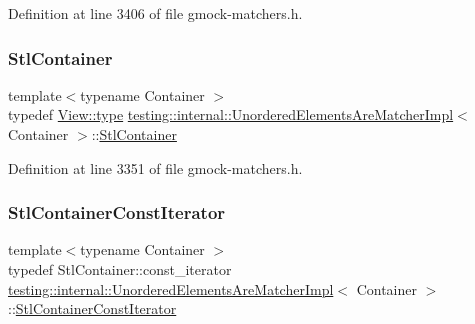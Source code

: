 Definition at line 3406 of file gmock-\/matchers.\+h.

\mbox{\label{classtesting_1_1internal_1_1UnorderedElementsAreMatcherImpl_a6c23354dfe53bb47fa3d38d2869e273c}} 
\subsubsection{\texorpdfstring{Stl\+Container}{StlContainer}}
{\footnotesize\ttfamily template$<$typename Container $>$ \\
typedef \hyperlink{classtesting_1_1internal_1_1StlContainerView_a2b2c63a6dcdbfe63fb0ee121ebf463ba}{View\+::type} \hyperlink{classtesting_1_1internal_1_1UnorderedElementsAreMatcherImpl}{testing\+::internal\+::\+Unordered\+Elements\+Are\+Matcher\+Impl}$<$ Container $>$\+::\hyperlink{classtesting_1_1internal_1_1UnorderedElementsAreMatcherImpl_a6c23354dfe53bb47fa3d38d2869e273c}{Stl\+Container}}



Definition at line 3351 of file gmock-\/matchers.\+h.

\mbox{\label{classtesting_1_1internal_1_1UnorderedElementsAreMatcherImpl_a656c30399e17043db476b639dcd4e6fa}} 
\subsubsection{\texorpdfstring{Stl\+Container\+Const\+Iterator}{StlContainerConstIterator}}
{\footnotesize\ttfamily template$<$typename Container $>$ \\
typedef Stl\+Container\+::const\+\_\+iterator \hyperlink{classtesting_1_1internal_1_1UnorderedElementsAreMatcherImpl}{testing\+::internal\+::\+Unordered\+Elements\+Are\+Matcher\+Impl}$<$ Container $>$\+::\hyperlink{classtesting_1_1internal_1_1UnorderedElementsAreMatcherImpl_a656c30399e17043db476b639dcd4e6fa}{Stl\+Container\+Const\+Iterator}}



